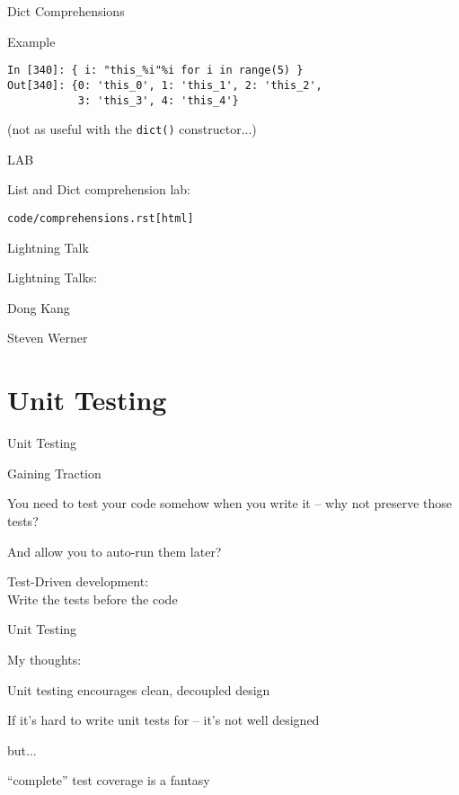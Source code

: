 \documentclass{beamer}
\begin{document}
\begin{frame}[fragile]{Dict Comprehensions}

{\Large Example}

\begin{verbatim}
In [340]: { i: "this_%i"%i for i in range(5) }
Out[340]: {0: 'this_0', 1: 'this_1', 2: 'this_2',
           3: 'this_3', 4: 'this_4'}
\end{verbatim}

\vfill
(not as useful with the \verb|dict()| constructor...)
\end{frame} 


\begin{frame}[fragile]{LAB}

\vfill
{\Large List and Dict comprehension lab:}

\vfill
{\large \verb|code/comprehensions.rst[html]| }

\vfill

\end{frame}


\begin{frame}{Lightning Talk}

{\LARGE Lightning Talks:}

{\large 
\vfill
Dong Kang

\vfill
Steven Werner
}
\vfill
\end{frame}


\section{Unit Testing}

\begin{frame}[fragile]{Unit Testing}

{\LARGE Gaining Traction}

\vfill
{\Large You need to test your code somehow when you write it --
        why not preserve those tests?}

\vfill
{\Large And allow you to auto-run them later?}

\vfill
{\LARGE Test-Driven development:}\\[0.1in]
{\Large \hspace{0.3in} Write the tests before the code}

\end{frame} 

\begin{frame}[fragile]{Unit Testing}

{\LARGE My thoughts:}

\vfill
{\Large Unit testing encourages clean, decoupled design}

\vfill
{\Large If it's hard to write unit tests for -- it's not well designed}

\vfill
{\Large but...}

\vfill
{\Large ``complete'' test coverage is a fantasy}

\end{frame} 
\end{document}
